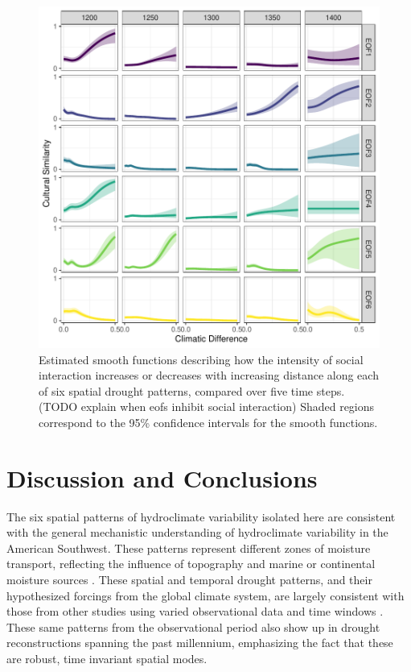 \documentclass[11pt]{iopart}
\begin{document}

\begin{figure}[!htbp]
\centering
\includegraphics[width=.8\linewidth]{figures/smooths.pdf}
\caption{Estimated smooth functions describing how the intensity of social interaction increases or decreases with increasing distance along each of six spatial drought patterns, compared over five time steps. (TODO explain when eofs inhibit social interaction) Shaded regions correspond to the 95\% confidence intervals for the smooth functions.}
\label{fig:smooths}
\end{figure}

\section*{Discussion and Conclusions}

The six spatial patterns of hydroclimate variability isolated here are consistent with the general mechanistic understanding of hydroclimate variability in the American Southwest. These patterns represent different zones of moisture transport, reflecting the influence of topography and marine or continental moisture sources \parencite{Liu2010, Hu2011}. These spatial and temporal drought patterns, and their hypothesized forcings from the global climate system, are largely consistent with those from other studies using varied observational data and time windows \parencite{Comrie1999,Cook1999,McCabe1999,McCabe2004,Ryu2010,Seager2014,Herrmann2016}. These same patterns from the observational period also show up in drought reconstructions spanning the past millennium, emphasizing the fact that these are robust, time invariant spatial modes.
\end{document}
